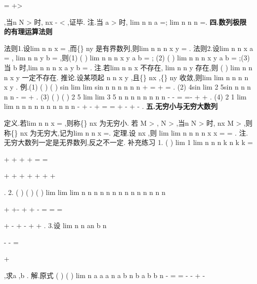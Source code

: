 =
+>




,当n
N
>
时,
nx
\varepsilon 
-
<
,证毕. 
\textcolor{lyred}{注}.当
a >
时, lim
n
n
a
\to \infty 
=; lim
n
n
n
\to \infty 
=. 
\vspace{4pt}
{\bfseries \textcolor{lyred}{四.数列极限的有理运算法则}}

\textcolor{lyred}{法则1}.设lim
n
n
x
\to \infty 
=
,而\{\}
ny
是有界数列,则lim
n
n
n
x y
\to \infty 
=
. 
\textcolor{lyred}{法则2}.设lim
n
n
x
a
\to \infty 
=
, lim
n
n
y
b
\to \infty 
=
,则(1)
(
)
lim
n
n
n
x
y
a
b
\to \infty 
\pm 
=
\pm ; 
(2)
(
)
lim
n
n
n
x
y
a b
\to \infty 
\cdots 
=
\cdots ;(3)当
b \neq 
时,lim
n
n
n
x
a
y
b
\to \infty 
=
. 
\textcolor{lyred}{注}.若lim
n
n
x
\to \infty 
不存在, lim
n
n
y
\to \infty 
存在,则
(
)
lim
n
n
n
x
y
\to \infty 
\pm 
一定不存在. 
\textcolor{lyred}{推论}.设某项起
n
n
x
y
\ge 
,且\{\}
nx
,\{\}
ny
收敛,则lim
lim
n
n
n
n
x
y
\to \infty 
\to \infty 
\ge 
. 
\textcolor{lyred}{例}.(1)
(
)
(
)
sin
lim
lim
sin
n
n
n
n
n
n
\to \infty 
\to \infty 
+
=
\cdots 
+
=
. 
(2)
4sin
lim 2
5sin
n
n
n
n
n
\to \infty 
-
=
+
. 
(3)
(
)
(
)
2 5
lim
lim
3 5
n
n
n
n
n
n
n
n
\to \infty 
\to \infty 
-
-
=
=-
+
+
. 
(4)
2 1
lim
lim
n
n
n
n
n
n
n
n
n
n
\to \infty 
\to \infty 
-
+
-
+
=
=
+
-
+
-
. 
\vspace{4pt}
{\bfseries \textcolor{lyred}{五.无穷小与无穷大数列}}

\textcolor{lyred}{定义}.若lim
n
n
x
\to \infty 
=
,则称\{\}
nx
为\textcolor{lyred}{无穷小}. 
若
M
\forall 
>
,
N
\exists 
>
,当n
N
>
时,
nx
M
>
,则称\{\}
nx
为\textcolor{lyred}{无穷大},记为lim
n
n
x
\to \infty 
=\infty . 
\textcolor{lyred}{定理}.设
nx \neq 
,则
lim
lim
n
n
n
n
x
x
\to \infty 
\to \infty 
=\infty \Leftrightarrow 
=
. 
\textcolor{lyred}{注}.无穷大数列一定是无界数列,反之不一定. 
\textcolor{lyred}{补充练习 }
1.
(
)
lim 1
lim
n
n
n
k
n
k
k
\to \infty 
\to \infty 
=


+
+
+
+
=
=


+
+
+
+
+
+
+


\sum 
\Lambda 
\Lambda 
. 
2.
(
)
(
)
(
)
lim
lim
lim
n
n
n
n
n
n
n
n
n n
n n
n
n
\to \infty 
\to \infty 
\to \infty 


+
+-
+
+
-
=
=
=


+
-
+
-
+
+
\Lambda 
\Lambda 
. 
3.设
lim
n
n
an
b
n
\to \infty 


-
-
=


+


,求a ,b . 
解.原式
(
)
(
)
lim
n
a
a
a n
a
b n
b
a
b
b
n
\to \infty 
-
=
=
-
-
+
-


